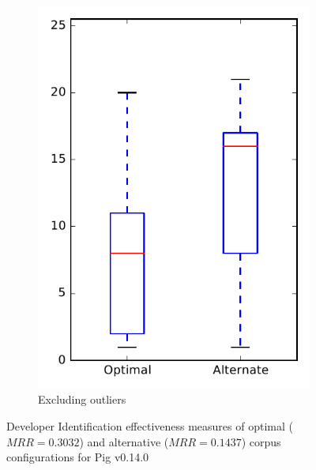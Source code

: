 \begin{figure}
\begin{subfigure}{.4\textwidth}
        \includegraphics[height=0.4\textheight]{figures/combo/dit_rq2_pig_no_outlier}
        \caption{Excluding outliers}\label{fig:combo:dit:rq2:pig_no_outlier}
    \end{subfigure}
\caption{Developer Identification effectiveness measures of optimal ($MRR=0.3032$) and alternative ($MRR=0.1437$) corpus configurations for Pig v0.14.0}
\label{fig:combo:dit:rq2:pig}
\end{figure}
